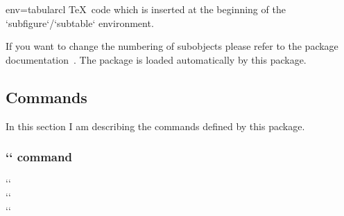 \begin{tableobject}{env=tabular}{cl}
  \TeX\ code which is inserted at the beginning of the `subfigure`\slash `subtable` environment.
\endkeydoc

If you want to change the numbering of subobjects please refer to the  package documentation~\autocite[section~5 ]{subcaption}.
The  package is loaded automatically by this package.
\endgroup


\subsection{Commands}
\label{commands}

In this section I am describing the commands defined by this package.


\subsubsection{`` command}
\label{includegraphicobject-command}
\begingroup
{}
`` \\
`` \\
``


\end{tableobject}
